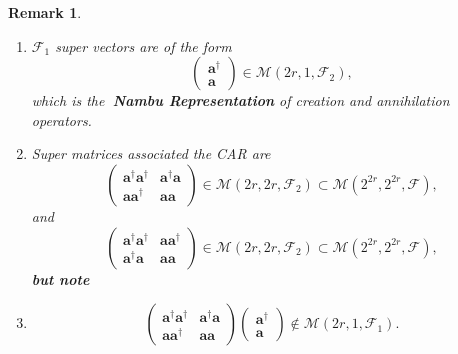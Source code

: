 \documentclass[aps,preprint]{revtex4}
\newtheorem{remark}[theorem]{Remark}
\begin{document}
\begin{remark}
\begin{enumerate}
\begin{enumerate}
\item $\mathcal{F}_{1}$ super vectors are of the form 
\begin{equation}
\left( 
\begin{array}{c}
\boldsymbol{a}^{\dagger } \\ 
\boldsymbol{a}%
\end{array}%
\right) \in \mathcal{M}\left( 2r,1,\mathcal{F}_{2}\right) ,
\end{equation}%
which is the\textbf{\ Nambu Representation} of creation and annihilation
operators.

\item Super matrices associated the CAR are 
\begin{equation}
\left( 
\begin{array}{cc}
\boldsymbol{a}^{\dagger }\boldsymbol{a}^{\dagger } & \boldsymbol{a}^{\dagger
}\boldsymbol{a} \\ 
\boldsymbol{aa}^{\dagger } & \boldsymbol{aa}%
\end{array}%
\right) \in \mathcal{M}\left( 2r,2r,\mathcal{F}_{2}\right) \subset \mathcal{M%
}\left( 2^{2r},2^{2r},\mathcal{F}\right) ,
\end{equation}%
and 
\begin{equation}
\left( 
\begin{array}{cc}
\boldsymbol{a}^{\dagger }\boldsymbol{a}^{\dagger } & \boldsymbol{aa}%
^{\dagger } \\ 
\boldsymbol{a}^{\dagger }\boldsymbol{a} & \boldsymbol{aa}%
\end{array}%
\right) \in \mathcal{M}\left( 2r,2r,\mathcal{F}_{2}\right) \subset \mathcal{M%
}\left( 2^{2r},2^{2r},\mathcal{F}\right) ,
\end{equation}%
\textbf{but note}

\item 
\begin{equation}
\left( 
\begin{array}{cc}
\boldsymbol{a}^{\dagger }\boldsymbol{a}^{\dagger } & \boldsymbol{a}^{\dagger
}\boldsymbol{a} \\ 
\boldsymbol{aa}^{\dagger } & \boldsymbol{aa}%
\end{array}%
\right) \left( 
\begin{array}{c}
\boldsymbol{a}^{\dagger } \\ 
\boldsymbol{a}%
\end{array}%
\right) \notin \mathcal{M}\left( 2r,1,\mathcal{F}_{1}\right) .
\end{equation}
\end{enumerate}
\end{enumerate}
\end{remark}
\end{document}
